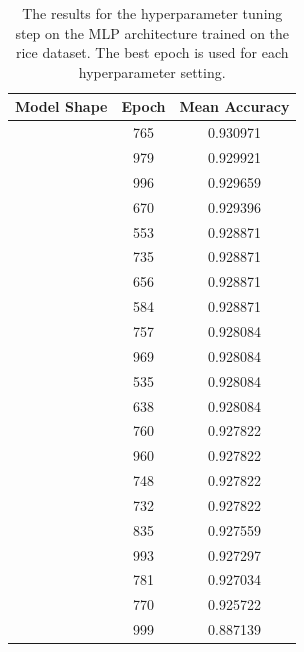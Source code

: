 \begin{table}
    \centering
    \begin{tabular}{c|c|c}
        Model Shape    & Epoch & Mean Accuracy \\
        \hline
        [7, 8, 8, 1]   & 765   & 0.930971 \\ \relax
        [7, 2, 1]      & 979   & 0.929921 \\ \relax
        [7, 2, 4, 1]   & 996   & 0.929659 \\ \relax
        [7, 1]         & 670   & 0.929396 \\ \relax
        [7, 16, 16, 1] & 553   & 0.928871 \\ \relax
        [7, 4, 16, 1]  & 735   & 0.928871 \\ \relax
        [7, 2, 16, 1]  & 656   & 0.928871 \\ \relax
        [7, 16, 1]     & 584   & 0.928871 \\ \relax
        [7, 16, 8, 1]  & 757   & 0.928084 \\ \relax
        [7, 8, 2, 1]   & 969   & 0.928084 \\ \relax
        [7, 8, 1]      & 535   & 0.928084 \\ \relax
        [7, 8, 4, 1]   & 638   & 0.928084 \\ \relax
        [7, 16, 2, 1]  & 760   & 0.927822 \\ \relax
        [7, 2, 8, 1]   & 960   & 0.927822 \\ \relax
        [7, 8, 16, 1]  & 748   & 0.927822 \\ \relax
        [7, 16, 4, 1]  & 732   & 0.927822 \\ \relax
        [7, 4, 8, 1]   & 835   & 0.927559 \\ \relax
        [7, 4, 4, 1]   & 993   & 0.927297 \\ \relax
        [7, 4, 1]      & 781   & 0.927034 \\ \relax
        [7, 4, 2, 1]   & 770   & 0.925722 \\ \relax
        [7, 2, 2, 1]   & 999   & 0.887139
    \end{tabular}
    \caption{The results for the hyperparameter tuning step on the MLP architecture trained on the rice
             dataset.
             The best epoch is used for each hyperparameter setting.}
    \label{tab:rice_nn}
\end{table}

